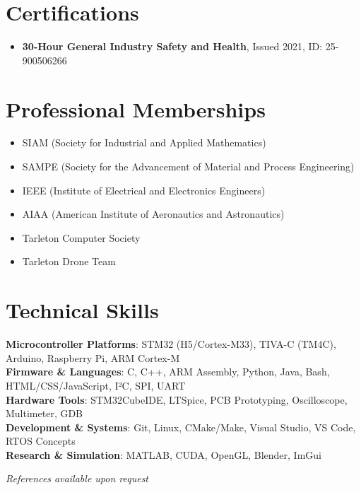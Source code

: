 \documentclass[letterpaper,11pt]{article}
\begin{document}
\section{Certifications}
  \begin{itemize}
    \item \textbf{30-Hour General Industry Safety and Health}, Issued 2021, ID: 25-900506266
  \end{itemize}

\section{Professional Memberships}
  \begin{itemize}
    \item SIAM (Society for Industrial and Applied Mathematics)
    \item SAMPE (Society for the Advancement of Material and Process Engineering)
    \item IEEE (Institute of Electrical and Electronics Engineers)
    \item AIAA (American Institute of Aeronautics and Astronautics)
    \item Tarleton Computer Society
    \item Tarleton Drone Team
  \end{itemize}
\section{Technical Skills}
 \begin{itemize}[leftmargin=0.15in, label={}]
    \small{\item{
      \textbf{Microcontroller Platforms}{: STM32 (H5/Cortex-M33), TIVA-C (TM4C), Arduino, Raspberry Pi, ARM Cortex-M} \\
      \textbf{Firmware \& Languages}{: C, C++, ARM Assembly, Python, Java, Bash, HTML/CSS/JavaScript, I²C, SPI, UART} \\
      \textbf{Hardware Tools}{: STM32CubeIDE, LTSpice, PCB Prototyping, Oscilloscope, Multimeter, GDB} \\
      \textbf{Development \& Systems}{: Git, Linux, CMake/Make, Visual Studio, VS Code, RTOS Concepts} \\
      \textbf{Research \& Simulation}{: MATLAB, CUDA, OpenGL, Blender, ImGui} 
}}
 \end{itemize}


\vspace{8pt}
\begin{center}
\textit{References available upon request}
\end{center}
\end{document}
